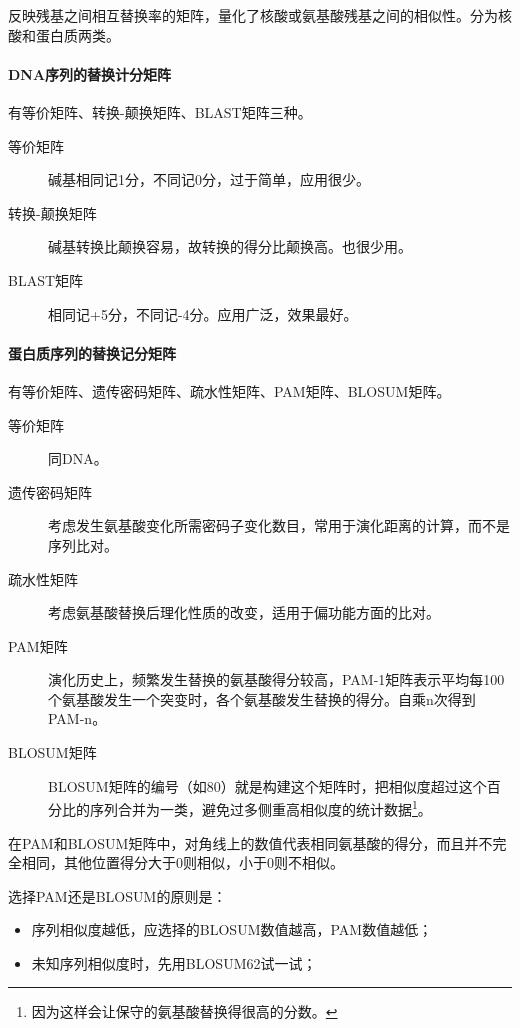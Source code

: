 反映残基之间相互替换率的矩阵，量化了核酸或氨基酸残基之间的相似性。分为核酸和蛋白质两类。

\paragraph{DNA序列的替换计分矩阵}

有等价矩阵、转换-颠换矩阵、BLAST矩阵三种。

\begin{description}
	\item[等价矩阵] 碱基相同记1分，不同记0分，过于简单，应用很少。
	\item[转换-颠换矩阵] 碱基转换比颠换容易，故转换的得分比颠换高。也很少用。
	\item[BLAST矩阵] 相同记+5分，不同记-4分。应用广泛，效果最好。
\end{description}


\paragraph{蛋白质序列的替换记分矩阵}

有等价矩阵、遗传密码矩阵、疏水性矩阵、PAM矩阵、BLOSUM矩阵。

\begin{description}
	\item[等价矩阵] 同DNA。
	\item[遗传密码矩阵] 考虑发生氨基酸变化所需密码子变化数目，常用于演化距离的计算，而不是序列比对。
	\item[疏水性矩阵] 考虑氨基酸替换后理化性质的改变，适用于偏功能方面的比对。
	\item[PAM矩阵] 演化历史上，频繁发生替换的氨基酸得分较高，PAM-1矩阵表示平均每100个氨基酸发生一个突变时，各个氨基酸发生替换的得分。自乘n次得到PAM-n。
	\item[BLOSUM矩阵] BLOSUM矩阵的编号（如80）就是构建这个矩阵时，把相似度超过这个百分比的序列合并为一类，避免过多侧重高相似度的统计数据\footnote{因为这样会让保守的氨基酸替换得很高的分数。}。
\end{description}

在PAM和BLOSUM矩阵中，对角线上的数值代表相同氨基酸的得分，而且并不完全相同，其他位置得分大于0则相似，小于0则不相似。

选择PAM还是BLOSUM的原则是：
\begin{itemize}
	\item 序列相似度越低，应选择的BLOSUM数值越高，PAM数值越低；
	\item 未知序列相似度时，先用BLOSUM62试一试；
\end{itemize}

